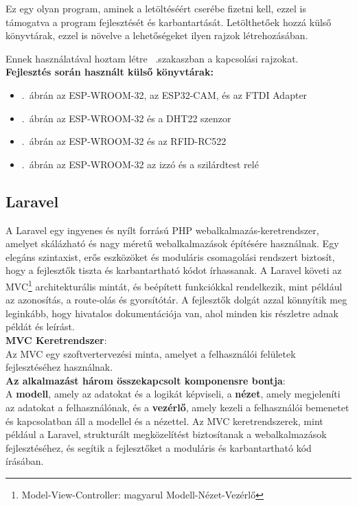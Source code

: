 \documentclass[
]{thesis-ekf}
\theoremstyle{definition}
\theoremstyle{remark}
\begin{document}
	Ez egy olyan program, aminek a letöltéséért cserébe fizetni kell, ezzel is támogatva a program fejlesztését és karbantartását. Letölthetőek hozzá külső könyvtárak, ezzel is növelve a lehetőségeket ilyen rajzok létrehozásában.
	
	Ennek használatával hoztam létre ~.szakaszban a kapcsolási rajzokat.\\
	\textbf{Fejlesztés során használt külső könyvtárak:}
	\begin{itemize}
		\item {}.~ábrán az ESP-WROOM-32, az ESP32-CAM, és az FTDI Adapter\cite{fritzing-library}
		\item {}.~ábrán az ESP-WROOM-32 és a DHT22 szenzor \cite{fritzing-library}
		\item {}.~ábrán az ESP-WROOM-32\cite{fritzing-library} és az RFID-RC522\cite{fritzing-rfid}
		\item {}.~ábrán az ESP-WROOM-32\cite{fritzing-library} az izzó\cite{fritzing-light} és a szilárdtest relé\cite{fritzing-SSR}
	\end{itemize}
	\subsection{Laravel}
	A Laravel egy ingyenes és nyílt forrású PHP webalkalmazás-keretrendszer, amelyet skálázható és nagy méretű webalkalmazások építésére használnak. Egy elegáns szintaxist, erős eszközöket és moduláris csomagolási rendszert biztosít, hogy a fejlesztők tiszta és karbantartható kódot írhassanak. A Laravel követi az MVC\footnote{Model-View-Controller: magyarul Modell-Nézet-Vezérlő} architekturális mintát, és beépített funkciókkal rendelkezik, mint például az azonosítás, a route-olás és gyorsítótár.\cite{laravel-intro}
	A fejlesztők dolgát azzal könnyítik meg leginkább, hogy hivatalos dokumentációja van, ahol minden kis részletre adnak példát és leírást.\cite{laravel-docs}\\
	\textbf{MVC Keretrendszer}:\\
	Az MVC egy szoftvertervezési minta, amelyet a felhasználói felületek fejlesztéséhez használnak. \\
	\textbf{Az alkalmazást három összekapcsolt komponensre bontja}:\\A \textbf{modell}, amely az adatokat és a logikát képviseli, a \textbf{nézet}, amely megjeleníti az adatokat a felhasználónak, és a \textbf{vezérlő}, amely kezeli a felhasználói bemenetet és kapcsolatban áll a modellel és a nézettel. Az MVC keretrendszerek, mint például a Laravel, strukturált megközelítést biztosítanak a webalkalmazások fejlesztéséhez, és segítik a fejlesztőket a moduláris és karbantartható kód írásában.
	
\end{document}
